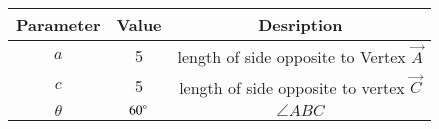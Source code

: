 
\begin{tabular}[]{|c|c|c|}
\hline
Parameter	& Value	& Desription \\ \hline
$a$	& 5 & length of side opposite to Vertex $\vec{A}$\\ \hline
	$c$	& 5 & length of side opposite to vertex $\vec{C}$\\ \hline
	$\theta$		& $60\degree$ & $\angle{ABC}$\\ \hline
\end{tabular}
